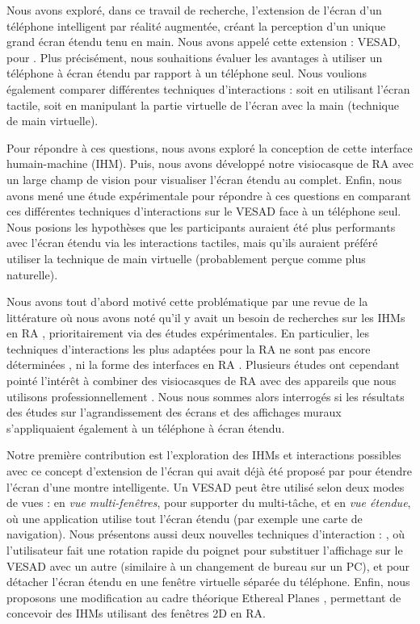 Nous avons exploré, dans ce travail de recherche, l'extension de l'écran d'un téléphone intelligent par réalité augmentée, créant la perception d'un unique grand écran étendu tenu en main. Nous avons appelé cette extension : VESAD, pour . Plus précisément, nous souhaitions évaluer les avantages à utiliser un téléphone à écran étendu par rapport à un téléphone seul. Nous voulions également comparer différentes techniques d'interactions : soit en utilisant l'écran tactile, soit en manipulant la partie virtuelle de l'écran avec la main (technique de main virtuelle).

Pour répondre à ces questions, nous avons exploré la conception de cette interface humain-machine (IHM). Puis, nous avons développé notre visiocasque de RA avec un large champ de vision pour visualiser l'écran étendu au complet. Enfin, nous avons mené une étude expérimentale pour répondre à ces questions en comparant ces différentes techniques d'interactions sur le VESAD face à un téléphone seul. Nous posions les hypothèses que les participants auraient été plus performants avec l'écran étendu via les interactions tactiles, mais qu'ils auraient préféré utiliser la technique de main virtuelle (probablement perçue comme plus naturelle).

Nous avons tout d'abord motivé cette problématique par une revue de la littérature  où nous avons noté qu'il y avait un besoin de recherches sur les IHMs en RA \citep{Billinghurst2005, Billinghurst2015}, prioritairement via des études expérimentales. En particulier, les techniques d'interactions les plus adaptées pour la RA ne sont pas encore déterminées \citep{Argelaguet2013, Piumsomboon2013, Piumsomboon2014}, ni la forme des interfaces en RA \citep{VanDam1997, Ens2014a, Serrano2015}. Plusieurs études ont cependant pointé l'intérêt à combiner des visiocasques de RA avec des appareils que nous utilisons professionnellement \citep{Grubert2015, Serrano2015a}. Nous nous sommes alors interrogés si les résultats des études sur l'agrandissement des écrans \citep{Baudisch2002, Guiard2004} et des affichages muraux \citep{Liu2014, Raedle2014} s'appliquaient également à un téléphone à écran étendu.

Notre première contribution est l'exploration des IHMs et interactions possibles avec ce concept d'extension de l'écran  qui avait déjà été proposé par \cite{Grubert2015} pour étendre l'écran d'une montre intelligente. Un VESAD peut être utilisé selon deux modes de vues : en \emph{vue multi-fenêtres}, pour supporter du multi-tâche, et en \emph{vue étendue}, où une application utilise tout l'écran étendu (par exemple une carte de navigation). Nous présentons aussi deux nouvelles techniques d'interaction : , où l'utilisateur fait une rotation rapide du poignet pour substituer l'affichage sur le VESAD avec un autre (similaire à un changement de bureau sur un PC), et  pour détacher l'écran étendu en une fenêtre virtuelle séparée du téléphone. Enfin, nous proposons une modification au cadre théorique Ethereal Planes \citep{Ens2014a}, permettant de concevoir des IHMs utilisant des fenêtres 2D en RA.

